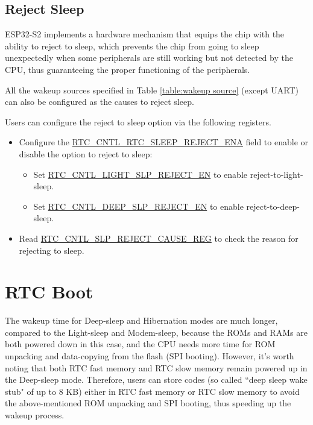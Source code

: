 \documentclass[main\_\_EN.tex]{subfiles}
\begin{document}
\subsection{Reject Sleep}\label{sec:lpm-reject-source}

ESP32-S2 implements a hardware mechanism that equips the chip with the ability to reject to sleep, which prevents the chip from going to sleep unexpectedly when some peripherals are still working but not detected by the CPU, thus guaranteeing the proper functioning of the peripherals.

All the wakeup sources specified in Table \ref{table:wakeup source} (except UART) can also be configured as the causes to reject sleep.

Users can configure the reject to sleep option via the following registers.
\begin{itemize}
    \item Configure the \hyperref[fielddesc:RTCCNTLRTCSLEEPREJECTENA]{RTC\_CNTL\_RTC\_SLEEP\_REJECT\_ENA} field to enable or disable the option to reject to sleep:
        \begin{itemize}
            \item Set \hyperref[fielddesc:RTCCNTLLIGHTSLPREJECTEN]{RTC\_CNTL\_LIGHT\_SLP\_REJECT\_EN} to enable reject-to-light-sleep.
            \item Set \hyperref[fielddesc:RTCCNTLDEEPSLPREJECTEN]{RTC\_CNTL\_DEEP\_SLP\_REJECT\_EN} to enable reject-to-deep-sleep.
        \end{itemize}
    \item Read \hyperref[fielddesc:RTCCNTLREJECTCAUSE]{RTC\_CNTL\_SLP\_REJECT\_CAUSE\_REG} to check the reason for rejecting to sleep.
\end{itemize}

\section{RTC Boot}
The wakeup time for Deep-sleep and Hibernation modes are much longer, compared to the Light-sleep and Modem-sleep, because the ROMs and RAMs are both powered down in this case, and the CPU needs more time for ROM unpacking and data-copying from the flash (SPI booting). However, it's worth noting that both RTC fast memory and RTC slow memory remain powered up in the Deep-sleep mode. Therefore, users can store codes (so called ``deep sleep wake stub" of up to 8 KB) either in RTC fast memory or RTC slow memory to avoid the above-mentioned ROM unpacking and SPI booting, thus speeding up the wakeup process.
\end{document}
